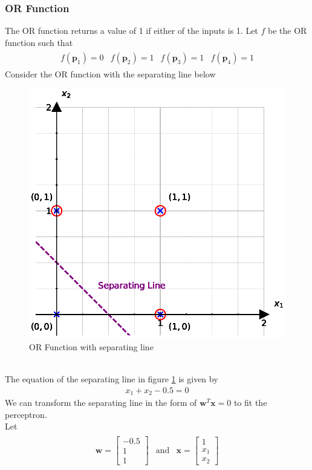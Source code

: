 \subsubsection*{OR Function}
The OR function returns a value of 1 if either of the inputs is 1. Let $f$ be the OR function such that
\begin{align}
\begin{matrix}
  \nonumber
  f(\textbf{p}_1) = 0 & f(\textbf{p}_2) = 1 & f(\textbf{p}_3) = 1 & f(\textbf{p}_4) = 1
\end{matrix}  
\end{align}
Consider the OR function with the separating line below
\begin{figure}[ht]
  \centering
  \includegraphics[scale=0.75]{CHAPTER_2/c2_fig_OR_function_python.eps}
  \caption{OR Function with separating line}
  \label{OR_function}
\end{figure}\\
The equation of the separating line in figure \ref{OR_function} is given by
\begin{align}
  x_1 + x_2 - 0.5 = 0
\end{align}
We can transform the separating line in the form of $\textbf{w}^T\textbf{x} = 0$ to fit the perceptron.\\
Let 
\begin{align}
  \begin{matrix}
    \textbf{w} = \begin{bmatrix}
      -0.5 \\
      1 \\
      1
    \end{bmatrix} & \text{and} & \textbf{x} = \begin{bmatrix}
      1 \\
      x_1 \\
      x_2
    \end{bmatrix}
  \end{matrix}
\end{align}
